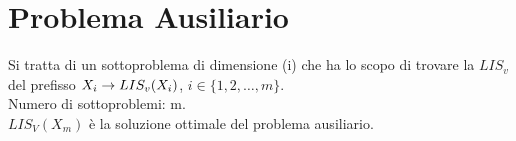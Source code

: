 \section{Problema Ausiliario}
Si tratta di un sottoproblema di dimensione (i) che ha lo scopo di trovare la $LIS_v$ del
prefisso $X_i \rightarrow LIS_v(X_i)$, $i \in \{1,2,\dots,m\}$.\\
Numero di sottoproblemi: m.\\
$LIS_V(X_m)$ \ra è la soluzione ottimale del problema ausiliario.

